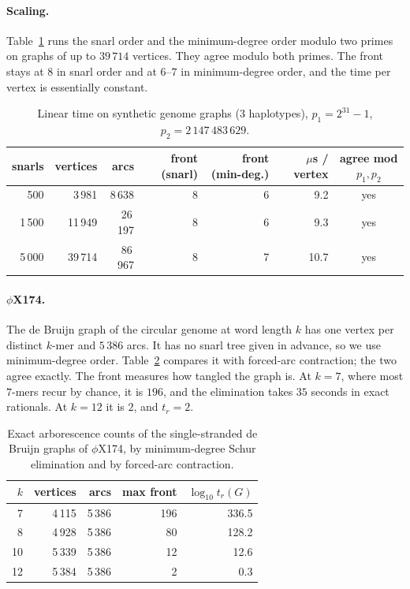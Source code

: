 \paragraph{Scaling.} Table~\ref{ch16:tab:scale} runs the snarl order and the minimum-degree order modulo two
primes on graphs of up to $39\,714$ vertices. They agree modulo both primes. The front stays at $8$ in
snarl order and at $6$--$7$ in minimum-degree order, and the time per vertex is essentially constant.

\begin{table}[t]
\centering\small
\begin{tabular}{rrrrrrc}
\toprule
snarls & vertices & arcs & front (snarl) & front (min-deg.) & $\mu$s / vertex & agree mod $p_1,p_2$\\
\midrule
500 & 3\,981 & 8\,638 & 8 & 6 & 9.2 & yes\\
1\,500 & 11\,949 & 26\,197 & 8 & 6 & 9.3 & yes\\
5\,000 & 39\,714 & 86\,967 & 8 & 7 & 10.7 & yes\\
\bottomrule
\end{tabular}
\caption{Linear time on synthetic genome graphs ($3$ haplotypes), $p_1=2^{31}-1$, $p_2=2\,147\,483\,629$.}
\label{ch16:tab:scale}
\end{table}

\paragraph{\texorpdfstring{$\phi$X174.}{phiX174.}} The de Bruijn graph of the circular genome at word length $k$ has one vertex per
distinct $k$-mer and $5\,386$ arcs. It has no snarl tree given in advance, so we use minimum-degree order.
Table~\ref{ch16:tab:phix} compares it with forced-arc contraction; the two agree exactly. The front measures
how tangled the graph is. At $k=7$, where most $7$-mers recur by chance, it is $196$, and the elimination
takes $35$ seconds in exact rationals. At $k=12$ it is $2$, and $t_r=2$.

\begin{table}[t]
\centering\small
\begin{tabular}{rrrrr}
\toprule
$k$ & vertices & arcs & max front & $\log_{10}t_r(G)$\\
\midrule
7 & 4\,115 & 5\,386 & 196 & 336.5\\
8 & 4\,928 & 5\,386 & 80 & 128.2\\
10 & 5\,339 & 5\,386 & 12 & 12.6\\
12 & 5\,384 & 5\,386 & 2 & 0.3\\
\bottomrule
\end{tabular}
\caption{Exact arborescence counts of the single-stranded de Bruijn graphs of $\phi$X174, by
minimum-degree Schur elimination and by forced-arc contraction.}\label{ch16:tab:phix}
\end{table}

